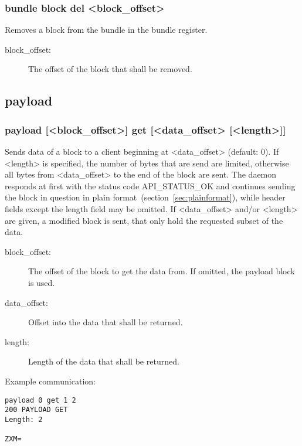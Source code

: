 \documentclass[12pt, a4paper]{scrartcl}
\begin{document}
\subsubsection*{bundle block del <block\_offset>}
Removes a block from the bundle in the bundle register.
\begin{description}
\item[block\_offset:] The offset of the block that shall be removed.
\end{description}
\subsection{payload}
\subsubsection*{payload [<block\_offset>] get [<data\_offset> [<length>]]}
Sends data of a block to a client beginning at <data\_offset> (default: 0).
If <length> is specified, the number of bytes that are send are limited, otherwise all bytes from <data\_offset> to the end of the block are sent.
The daemon responds at first with the status code API\_STATUS\_OK and continues sending the block in question in plain format~(section~\ref{sec:plainformat}), while header fields except the length field  may be omitted.
If <data\_offset> and/or <length> are given, a modified block is sent, that only hold the requested subset of the data.
\begin{description}
\item[block\_offset:] The offset of the block to get the data from.
	If omitted, the payload block is used.
\item[data\_offset:] Offset into the data that shall be returned.
\item[length:] Length of the data that shall be returned.
\end{description}
Example communication:\\
\makebox[\textwidth]{\hrulefill}
\begin{verbatim}
payload 0 get 1 2
200 PAYLOAD GET
Length: 2

ZXM=

\end{verbatim}
\makebox[\textwidth]{\hrulefill}
\end{document}
